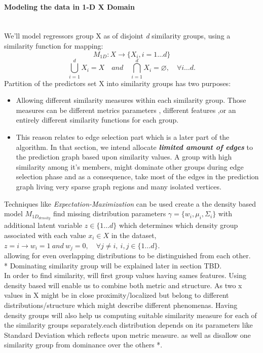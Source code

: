 \documentclass[a4paper]{article}
\begin{document}
\paragraph{Modeling the data in 1-D X Domain}\hspace{0pt}\\
We'll model regressors group X as of disjoint \emph{d} similarity groups, using a similarity function for mapping:
\begin{equation}
M_{1D} :X   \rightarrow {\lbrace X_i, i=1\dots d \rbrace}
\end{equation}
\begin{equation}
\bigcup\limits_{i=1}^{d}X_i = X\quad and \quad\bigcap\limits_{i=1}^{d}X_i=\varnothing, \quad  \forall i\dots d.
\end{equation}
Partition of the predictors set X into similarity groups has two purposes:
\begin{itemize}
\item Allowing different similarity measures within each similarity group. Those measures can be different metrics parameters , different features ,or an entirely different similarity functions for each group.
\item
This reason relates to edge selection part which is a later part of the algorithm. In that section, we intend allocate \textbf {\emph {limited amount of edges}} to the prediction graph based upon similarity values. A group with high similarity among it's members, might dominate other groups during edge selection phase and as a consequence, take most of the edges in the prediction graph living very sparse graph regions and many isolated vertices.
\end{itemize}
\iffalse
Techniques like \emph{Expectation-Maximization} can be used create a the density based model $M_{1D}_{density}$  find missing distribution parameters $\gamma = \{w_i, \mu_i, \Sigma_i\}$ with additional latent variable $z\in \lbrace 1\dots d \rbrace$ which determines which density group associated with each value $x_i\in X$ in the dataset,\\
$z=i\rightarrow w_i=1\ and\ w_j=0,\quad \forall j\neq i,\ i ,j\in \{1\dots d\}$.\\
allowing for even overlapping distributions to be distinguished from each other.\\
* Dominating similarity group will be explained later in section TBD.\\
In order to find similarity, will first group values having sames features.
Using density based will enable us to combine both metric and
structure.
As two x values in X  might be in close proximity/localized but belong 
to different distributions/structure which might describe different 
phenomenas.
Having density groups will also help us computing suitable similarity measure for each of the similarity groups separately.each distribution depends on its parameters like Standard Deviation which reflects upon metric measure.
 as well as disallow one similarity group from dominance over the others *.
\end{document}
